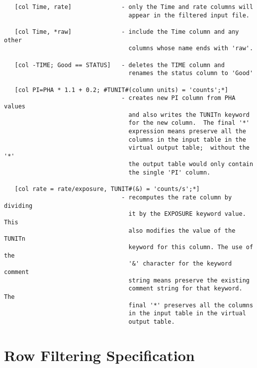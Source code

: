 \documentclass[11pt]{book}
\begin{document}
\begin{verbatim}
   [col Time, rate]              - only the Time and rate columns will
                                   appear in the filtered input file.

   [col Time, *raw]              - include the Time column and any other
                                   columns whose name ends with 'raw'.

   [col -TIME; Good == STATUS]   - deletes the TIME column and
                                   renames the status column to 'Good'

   [col PI=PHA * 1.1 + 0.2; #TUNIT#(column units) = 'counts';*]
                                 - creates new PI column from PHA values
                                   and also writes the TUNITn keyword
                                   for the new column.  The final '*'
                                   expression means preserve all the
                                   columns in the input table in the
                                   virtual output table;  without the '*'
                                   the output table would only contain
                                   the single 'PI' column.

   [col rate = rate/exposure, TUNIT#(&) = 'counts/s';*]
                                 - recomputes the rate column by dividing
                                   it by the EXPOSURE keyword value. This
                                   also modifies the value of the TUNITn
                                   keyword for this column. The use of the
                                   '&' character for the keyword comment
                                   string means preserve the existing
                                   comment string for that keyword. The
                                   final '*' preserves all the columns
                                   in the input table in the virtual
                                   output table.
\end{verbatim}


\section{Row Filtering Specification}
\end{document}
